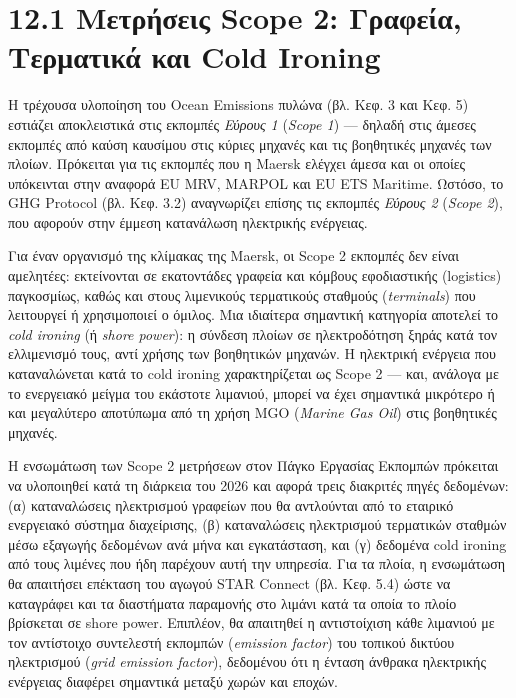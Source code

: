 \documentclass[11pt,a4paper,greek,twoside]{template-xe}
\begin{document}
\section{12.1 Μετρήσεις Scope 2: Γραφεία, Τερματικά και Cold
Ironing}\label{ux3bcux3b5ux3c4ux3c1ux3aeux3c3ux3b5ux3b9ux3c2-scope-2-ux3b3ux3c1ux3b1ux3c6ux3b5ux3afux3b1-ux3c4ux3b5ux3c1ux3bcux3b1ux3c4ux3b9ux3baux3ac-ux3baux3b1ux3b9-cold-ironing}

Η τρέχουσα υλοποίηση του Ocean Emissions πυλώνα (βλ. Κεφ. 3 και Κεφ. 5)
εστιάζει αποκλειστικά στις εκπομπές \emph{Εύρους 1} (\emph{Scope 1}) ---
δηλαδή στις άμεσες εκπομπές από καύση καυσίμου στις κύριες μηχανές και
τις βοηθητικές μηχανές των πλοίων. Πρόκειται για τις εκπομπές που η
Maersk ελέγχει άμεσα και οι οποίες υπόκεινται στην αναφορά EU MRV,
MARPOL και EU ETS Maritime. Ωστόσο, το GHG Protocol (βλ. Κεφ. 3.2)
αναγνωρίζει επίσης τις εκπομπές \emph{Εύρους 2} (\emph{Scope 2}), που
αφορούν στην έμμεση κατανάλωση ηλεκτρικής ενέργειας.

Για έναν οργανισμό της κλίμακας της Maersk, οι Scope 2 εκπομπές δεν
είναι αμελητέες: εκτείνονται σε εκατοντάδες γραφεία και κόμβους
εφοδιαστικής (logistics) παγκοσμίως, καθώς και στους λιμενικούς
τερματικούς σταθμούς (\emph{terminals}) που λειτουργεί ή χρησιμοποιεί ο
όμιλος. Μια ιδιαίτερα σημαντική κατηγορία αποτελεί το \emph{cold
ironing} (ή \emph{shore power}): η σύνδεση πλοίων σε ηλεκτροδότηση ξηράς
κατά τον ελλιμενισμό τους, αντί χρήσης των βοηθητικών μηχανών. Η
ηλεκτρική ενέργεια που καταναλώνεται κατά το cold ironing χαρακτηρίζεται
ως Scope 2 --- και, ανάλογα με το ενεργειακό μείγμα του εκάστοτε
λιμανιού, μπορεί να έχει σημαντικά μικρότερο ή και μεγαλύτερο αποτύπωμα
από τη χρήση MGO (\emph{Marine Gas Oil}) στις βοηθητικές μηχανές.

Η ενσωμάτωση των Scope 2 μετρήσεων στον Πάγκο Εργασίας Εκπομπών
πρόκειται να υλοποιηθεί κατά τη διάρκεια του 2026 και αφορά τρεις
διακριτές πηγές δεδομένων: (α) καταναλώσεις ηλεκτρισμού γραφείων που θα
αντλούνται από το εταιρικό ενεργειακό σύστημα διαχείρισης, (β)
καταναλώσεις ηλεκτρισμού τερματικών σταθμών μέσω εξαγωγής δεδομένων ανά
μήνα και εγκατάσταση, και (γ) δεδομένα cold ironing από τους λιμένες που
ήδη παρέχουν αυτή την υπηρεσία. Για τα πλοία, η ενσωμάτωση θα απαιτήσει
επέκταση του αγωγού STAR Connect (βλ. Κεφ. 5.4) ώστε να καταγράφει και
τα διαστήματα παραμονής στο λιμάνι κατά τα οποία το πλοίο βρίσκεται σε
shore power. Επιπλέον, θα απαιτηθεί η αντιστοίχιση κάθε λιμανιού με τον
αντίστοιχο συντελεστή εκπομπών (\emph{emission factor}) του τοπικού
δικτύου ηλεκτρισμού (\emph{grid emission factor}), δεδομένου ότι η
ένταση άνθρακα ηλεκτρικής ενέργειας διαφέρει σημαντικά μεταξύ χωρών και
εποχών.
\end{document}
